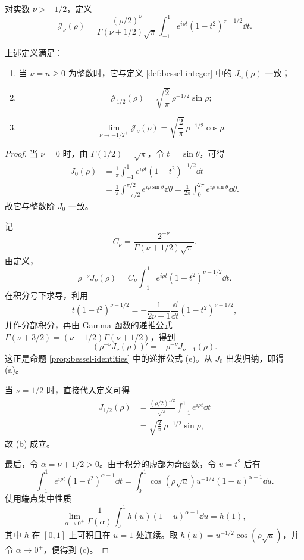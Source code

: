 \begin{definition}\label{def:bessel-general-order}
	对实数 $\nu>-1/2$，定义
	\[
	\mathcal{J}_\nu(\rho)
	=\frac{(\rho/2)^\nu}
	{\Gamma(\nu+1/2)\sqrt\pi}
	\int_{-1}^1e^{i\rho t}
	(1-t^2)^{\nu-1/2}\dd t.
	\]
\end{definition}
	上述定义满足：
\begin{proposition}\label{prop:bessel-general-order-properties}

	\begin{enumerate}[label=(\alph*)]
		\item 当 $\nu=n\geq0$ 为整数时，它与定义
		\ref{def:bessel-integer} 中的 $J_n(\rho)$ 一致；

		\item
		\[
		\mathcal{J}_{1/2}(\rho)
		=\sqrt{\frac2\pi}\,\rho^{-1/2}\sin\rho;
		\]

		\item
		\[
		\lim_{\nu\to-1/2^+}\mathcal{J}_\nu(\rho)
		=\sqrt{\frac2\pi}\,\rho^{-1/2}\cos\rho.
		\]
	\end{enumerate}
\end{proposition}

\begin{proof}
	当 $\nu=0$ 时，由 $\Gamma(1/2)=\sqrt\pi$，令 $t=\sin\theta$，可得
	\[
	\begin{aligned}
	J_0(\rho)
	&=\frac1\pi\int_{-1}^1
	e^{i\rho t}(1-t^2)^{-1/2}\dd t\\
	&=\frac1\pi\int_{-\pi/2}^{\pi/2}
	e^{i\rho\sin\theta}\dd\theta
	=\frac1{2\pi}\int_0^{2\pi}
	e^{i\rho\sin\theta}\dd\theta.
	\end{aligned}
	\]
	故它与整数阶 $J_0$ 一致。

	记
	\[
	C_\nu=\frac{2^{-\nu}}
	{\Gamma(\nu+1/2)\sqrt\pi}.
	\]
	由定义，
	\[
	\rho^{-\nu}J_\nu(\rho)
	=C_\nu\int_{-1}^1e^{i\rho t}
	(1-t^2)^{\nu-1/2}\dd t.
	\]
	在积分号下求导，利用
	\[
	t(1-t^2)^{\nu-1/2}
	=-\frac1{2\nu+1}\frac{\dd}{\dd t}
	(1-t^2)^{\nu+1/2},
	\]
	并作分部积分，再由 Gamma 函数的递推公式
	$\Gamma(\nu+3/2)=(\nu+1/2)\Gamma(\nu+1/2)$，得到
	\[
	\left(\rho^{-\nu}J_\nu(\rho)\right)'
	=-\rho^{-\nu}J_{\nu+1}(\rho).
	\]
	这正是命题 \ref{prop:bessel-identities} 中的递推公式 (e)。从 $J_0$ 出发归纳，即得 (a)。

	当 $\nu=1/2$ 时，直接代入定义可得
	\[
	\begin{aligned}
	J_{1/2}(\rho)
	&=\frac{(\rho/2)^{1/2}}{\sqrt\pi}
	\int_{-1}^1e^{i\rho t}\dd t\\
	&=\sqrt{\frac2\pi}\,\rho^{-1/2}\sin\rho,
	\end{aligned}
	\]
	故 (b) 成立。

	最后，令 $\alpha=\nu+1/2>0$。由于积分的虚部为奇函数，令 $u=t^2$ 后有
	\[
	\int_{-1}^1e^{i\rho t}(1-t^2)^{\alpha-1}\dd t
	=\int_0^1\cos(\rho\sqrt u)
	u^{-1/2}(1-u)^{\alpha-1}\dd u.
	\]
	使用端点集中性质
	\[
	\lim_{\alpha\to0^+}\frac1{\Gamma(\alpha)}
	\int_0^1h(u)(1-u)^{\alpha-1}\dd u=h(1),
	\]
	其中 $h$ 在 $[0,1]$ 上可积且在 $u=1$ 处连续。取
	$h(u)=u^{-1/2}\cos(\rho\sqrt u)$，并令
	$\alpha\to0^+$，便得到 (c)。
\end{proof}

